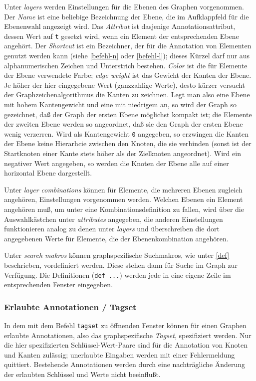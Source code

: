 \documentclass[12pt]{scrartcl}
\begin{document}
Unter \textit{layers} werden Einstellungen für die Ebenen des Graphen vorgenommen. Der \textit{Name} ist eine beliebige Bezeichnung der Ebene, die im Aufklappfeld für die Ebenenwahl angezeigt wird. Das \textit{Attribut} ist dasjenige Annotationsattribut, dessen Wert auf \texttt{t} gesetzt wird, wenn ein Element der entsprechenden Ebene angehört. Der \textit{Shortcut} ist ein Bezeichner, der für die Annotation von Elementen genutzt werden kann (siehe \ref{befehl-n} oder \ref{befehl-l}); dieses Kürzel darf nur aus alphanumerischen Zeichen und Unterstrich bestehen. \textit{Color} ist die für Elemente der Ebene verwendete Farbe; \textit{edge weight} ist das Gewicht der Kanten der Ebene. Je höher der hier eingegebene Wert (ganzzahlige Werte), desto kürzer versucht der Graphzeichenalgorithmus die Kanten zu zeichnen. Legt man also eine Ebene mit hohem Kantengewicht und eine mit niedrigem an, so wird der Graph so gezeichnet, daß der Graph der ersten Ebene möglichst kompakt ist; die Elemente der zweiten Ebene werden so angeordnet, daß sie den Graph der ersten Ebene wenig verzerren. Wird als Kantengewicht \texttt{0} angegeben, so erzwingen die Kanten der Ebene keine Hierarhcie zwischen den Knoten, die sie verbinden (sonst ist der Startknoten einer Kante stets höher als der Zielknoten angeordnet). Wird ein negativer Wert angegeben, so werden die Knoten der Ebene alle auf einer horizontal Ebene dargestellt.

Unter \textit{layer combinations} können für Elemente, die mehreren Ebenen zugleich angehören, Einstellungen vorgenommen werden. Welchen Ebenen ein Element angehören muß, um unter eine Kombinationsdefinition zu fallen, wird über die Auswahlkästchen unter \textit{attributes} angegeben, die anderen Einstellungen funktionieren analog zu denen unter \textit{layers} und überschreiben die dort angegebenen Werte für Elemente, die der Ebenenkombination angehören.

Unter \textit{search makros} können graphspezifische Suchmakros, wie unter \ref{def} beschrieben, vordefiniert werden. Diese stehen dann für Suche im Graph zur Verfügung. Die Definitionen (\texttt{def ...}) werden jede in eine eigene Zeile im entsprechenden Fenster eingegeben.

\subsubsection{Erlaubte Annotationen / Tagset}\label{erlaubteannotationen}

In dem mit dem Befehl \texttt{tagset} zu öffnenden Fenster können für einen Graphen erlaubte Annotationen, also das graphspezifische \textit{Tagset}, spezifiziert werden. Nur die hier spezifizierten Schlüssel-Wert-Paare sind für die Annotation von Knoten und Kanten zulässig; unerlaubte Eingaben werden mit einer Fehlermeldung quittiert. Bestehende Annotationen werden durch eine nachträgliche Änderung der erlaubten Schlüssel und Werte nicht beeinflußt.
\end{document}
